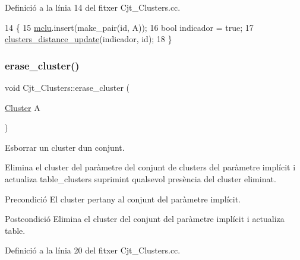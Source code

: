 Definició a la línia 14 del fitxer Cjt\+\_\+\+Clusters.\+cc.


\begin{DoxyCode}
14                                                           \{
15     \hyperlink{class_cjt___clusters_a5f5e13255bca1fac2ad65c51473f6ead}{mclu}.insert(make\_pair(\textcolor{keywordtype}{id}, A));
16     \textcolor{keywordtype}{bool} indicador = \textcolor{keyword}{true};
17     \hyperlink{class_cjt___clusters_ad794d3d1b0df7adb7fbb35d21634f5a0}{clusters\_distance\_update}(indicador, \textcolor{keywordtype}{id});
18 \}   
\end{DoxyCode}
\mbox{\label{class_cjt___clusters_a779452d093c92ec42e47987a84ea48ff}} 
\subsubsection{\texorpdfstring{erase\+\_\+cluster()}{erase\_cluster()}}
{\footnotesize\ttfamily void Cjt\+\_\+\+Clusters\+::erase\+\_\+cluster (\begin{DoxyParamCaption}\item[{\hyperlink{class_cluster}{Cluster}}]{A }\end{DoxyParamCaption})}



Esborrar un cluster d\textquotesingle{}un conjunt. 

Elimina el cluster del paràmetre del conjunt de clusters del paràmetre implícit i actualiza table\+\_\+clusters suprimint qualsevol presència del cluster eliminat.

\begin{DoxyPrecond}{Precondició}
El cluster pertany al conjunt del paràmetre implícit. 
\end{DoxyPrecond}
\begin{DoxyPostcond}{Postcondició}
Elimina el cluster del conjunt del paràmetre implícit i actualiza table. 
\end{DoxyPostcond}


Definició a la línia 20 del fitxer Cjt\+\_\+\+Clusters.\+cc.


